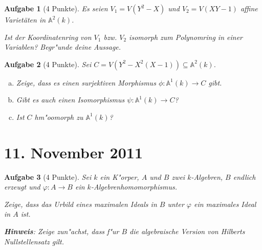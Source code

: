 \documentclass[a4paper, 12pt, numbers=noendperiod, chapterprefix=true]{scrbook}
\theoremstyle{break}
\newtheorem{Aufg}{Aufgabe}
\theoremstyle{nonumberbreak}
\theoremstyle{nonumberplain}
\newcommand{\A}{\mathbb{A}}
\newcommand{\Affine}{\mathbb{A}} %
\begin{document}
\begin{Aufg}[4 Punkte]
Es seien $V_1 = V(Y^2-X)$ und $V_2 = V(XY-1)$ affine Variet\"aten in $\Affine^2(k)$. 

Ist der Koordinatenring von $V_1$ bzw. $V_2$ isomorph zum Polynomring in einer Variablen? Begr"unde deine Aussage.
\end{Aufg}

\begin{Aufg}[4 Punkte]
Sei $C = V(Y^2 - X^2(X-1))\subseteq \Affine^2(k)$.
\begin{enumerate}[a)]
	\item Zeige, dass es einen surjektiven Morphismus $\phi:\Affine^1(k)\to C$ gibt.
	\item Gibt es auch einen Isomorphismus $\psi:\Affine^1(k)\to C$?
	\item Ist $C$ hm"oomorph zu $\Affine^1(k)$?
\end{enumerate}\end{Aufg}

\newpage
\section{11. November 2011}
\setcounter{Aufg}{0}
\setcounter{Loes}{0}

\begin{Aufg}[4 Punkte]
Sei $k$ ein K"orper, $A$ und $B$ zwei $k$-Algebren, $B$ endlich erzeugt und $\varphi \colon A \to B$ ein $k$-Algebrenhomomorphismus. 

Zeige, dass das Urbild eines maximalen Ideals in $B$ unter $\varphi$ ein maximales Ideal in $A$ ist.

\textbf{Hinweis}: Zeige zun"achst, dass f"ur $B$ die algebraische Version von Hilberts Nullstellensatz gilt.
\end{Aufg}
\end{document}
